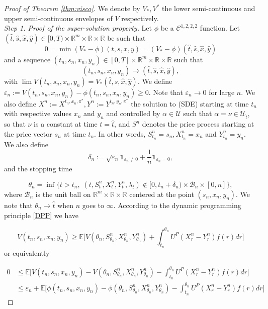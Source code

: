 \documentclass[10pt,a4paper]{amsart}
\newcommand{\E}{\mathbb{E}}
\begin{document}
\begin{proof}[Proof of Theorem \ref{thm:visco}] We denote by $V_*,V^*$ the lower semi-continuous and upper semi-continuous envelopes of $V$ respectively.\\


    \textit{Step 1. Proof of the super-solution property.} Let $\phi$ be a $\mathcal C^{1,2,2,2}$ function. Let $(\hat t,\hat s,\hat x,\hat y)\in [0,T)\times \mathbb R^m\times \mathbb R\times \mathbb R$ be such that 
    \[0=\min (V_*-\phi)(t,s,x,y)=(V_*-\phi)(\hat t,\hat s,\hat x,\hat y)\] and a sequence $(t_n,s_n,x_n,y_n)\in [0,T]\times \mathbb R^m\times \mathbb R\times \mathbb R$ such that 
    \[ (t_n,s_n,x_n,y_n)\longrightarrow  (\hat t,\hat s,\hat x,\hat y),\] with 
    $\lim\limits V(t_n,s_n,x_n,y_n) =V_*(\hat t,\hat s,\hat x,\hat y)$. We define $\varepsilon_n:= V(t_n,s_n,x_n,y_n)-\phi(t_n,s_n,x_n,y_n)\geq 0$. Note that $\varepsilon_n\longrightarrow 0$ for large $n$. We also define $X^n:=X^{t_n,x_n,\pi^*},Y^n:=Y^{t_n,y_n,\pi^*}$ the solution to (SDE) starting at time $t_n$ with respective values $x_n$ and $y_n$ and controlled by $\alpha\in \mathcal U$ such that $\alpha=\nu\in \mathcal U_{\hat t}$, so that $\nu$ is a constant at time $t=\hat t$, and $S^n$ denotes the price process starting at the price vector $s_n$ at time $t_n$. In other words, $S^n_{t_n}=s_n, X^n_{t_n}=x_n$ and $Y^n_{t_n}=y_n$. We also define 
    \[\delta_n:= \sqrt{\varepsilon_n}\mathbf 1_{\varepsilon_n\neq 0} + \frac1n \mathbf 1_{\varepsilon_n= 0},\]
and the stopping time

\[\theta_n=\inf\{t>t_n,\; (t,S^n_t,X^n_t,Y^n_t,\lambda_t)\notin [0,t_n+\delta_n)\times \mathcal B_n\times [0,n]\},\]
where $\mathcal B_n$ is the unit ball on $\mathbb R^m\times\mathbb R\times \mathbb R$ centered at the point $(s_n,x_n,y_n)$. We note that $\theta_n\longrightarrow \hat t$ when $n$ goes to $\infty$. According to the dynamic programming principle \eqref{DPP} we have 

\[ V(t_n,s_n,x_n,y_n)\geq  \E\bigl[ V(\theta_n, S_{\theta_n}^{n},X_{\theta_n}^{n},Y_{\theta_n}^{n}) + \int_{t_n}^{\theta_n}U^P(X_{r}^{n} - Y^{n}_r) f(r)dr \bigl]
\]
or equivalently


\begin{align*}
0&\leq  \E\bigl[V(t_n,s_n,x_n,y_n)- V(\theta_n, S_{\theta_n}^{n},X_{\theta_n}^{n},Y_{\theta_n}^{n}) - \int_{t_n}^{\theta_n}U^P(X_{r}^{n} - Y^{n}_r) f(r)dr \bigl]\\
&\leq \varepsilon_n+ \E\bigl[\phi(t_n,s_n,x_n,y_n)- \phi(\theta_n, S_{\theta_n}^{n},X_{\theta_n}^{n},Y_{\theta_n}^{n}) - \int_{t_n}^{\theta_n}U^P(X_{r}^{n} - Y^{n}_r) f(r)dr \bigl]
\end{align*}


\end{proof}
\end{document}
